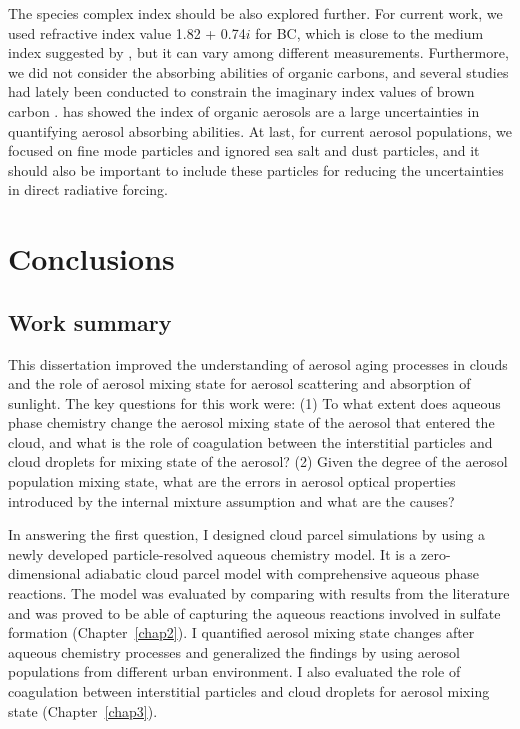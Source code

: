 \documentclass[edeposit,fullpage]{uiucthesis2009}
\begin{document}
The species complex index should be also explored further. For current
work, we used refractive index value 1.82 + 0.74$i$ for BC, which is
close to the medium index suggested by \citet{stier2007aerosol}, but
it can vary among different measurements.  Furthermore, we did not
consider the absorbing abilities of organic carbons, and several
studies had lately been conducted to constrain the imaginary index
values of brown carbon \citep{liu2020lifecycle}. \citet{Esteve2014}
has showed the index of organic aerosols are a large uncertainties in
quantifying aerosol absorbing abilities. At last, for current aerosol
populations, we focused on fine mode particles and ignored sea salt
and dust particles, and it should also be important to include these
particles for reducing the uncertainties in direct radiative forcing.

\chapter{Conclusions}
\label{chap5}
\section{Work summary}
This dissertation improved the understanding of aerosol aging
processes in clouds and the role of aerosol mixing state for aerosol
scattering and absorption of sunlight. The key questions for this work
were: (1) To what extent does aqueous phase chemistry change the
aerosol mixing state of the aerosol that entered the cloud, and what
is the role of coagulation between the interstitial particles and
cloud droplets for mixing state of the aerosol? (2) Given the degree
of the aerosol population mixing state, what are the errors in aerosol
optical properties introduced by the internal mixture assumption and
what are the causes?

In answering the first question, I designed cloud parcel simulations
by using a newly developed particle-resolved aqueous chemistry
model. It is a zero-dimensional adiabatic cloud parcel model with
comprehensive aqueous phase reactions. The model was evaluated by
comparing with results from the literature and was proved to be able
of capturing the aqueous reactions involved in sulfate formation
(Chapter~\ref{chap2}). I quantified aerosol mixing state changes after
aqueous chemistry processes and generalized the findings by using
aerosol populations from different urban environment. I also evaluated
the role of coagulation between interstitial particles and cloud
droplets for aerosol mixing state (Chapter~\ref{chap3}).
\end{document}
